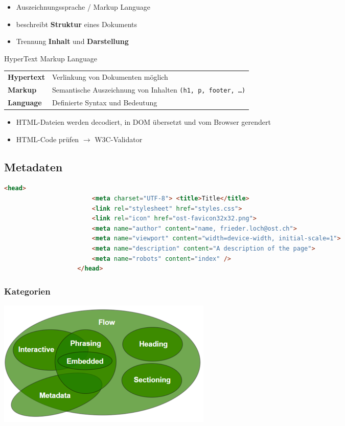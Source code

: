 \documentclass[a4paper, landscape, 8pt]{scrartcl}
\begin{document}
\begin{multicols*}{4}
        \begin{itemize}
            \item Auszeichnungssprache / Markup Language
            \item beschreibt \textbf{Struktur} eines Dokuments
            \item Trennung \textbf{Inhalt} und \textbf{Darstellung}
        \end{itemize}
        \textcolor{subsectioncolor}{HyperText Markup Language} \\
        \begin{tabularx}{\columnwidth}{l | X}
            \textbf{Hypertext} & Verlinkung von Dokumenten möglich \\
            \textbf{Markup} & Semantische Auszeichnung von Inhalten \texttt{(h1, p, footer, \ldots)} \\
            \textbf{Language} & Definierte Syntax und Bedeutung
        \end{tabularx}

        \begin{itemize}
            \item HTML-Dateien werden decodiert, in DOM übersetzt und vom Browser gerendert
            \item HTML-Code prüfen $\to$ W3C-Validator
        \end{itemize}

        \subsection{Metadaten}
        \begin{lstlisting}[language=HTML]
                    <head>
                        <meta charset="UTF-8"> <title>Title</title>
                        <link rel="stylesheet" href="styles.css">
                        <link rel="icon" href="ost-favicon32x32.png">
                        <meta name="author" content="name, frieder.loch@ost.ch">
                        <meta name="viewport" content="width=device-width, initial-scale=1">
                        <meta name="description" content="A description of the page">
                        <meta name="robots" content="index" />
                    </head>
        \end{lstlisting}

        \subsubsection{Kategorien}
        \includegraphics[scale=0.3]{graphic/00-categories-elements}


\end{multicols*}
\end{document}

